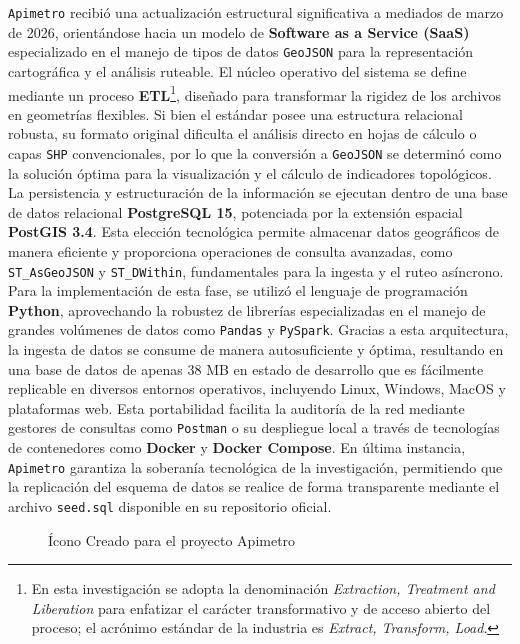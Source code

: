 \texttt{Apimetro} recibió una actualización estructural significativa a mediados de marzo de 2026, orientándose hacia un modelo de 
\textbf{Software as a Service (SaaS)} especializado en el manejo de tipos de datos \texttt{GeoJSON} para la representación cartográfica y el análisis ruteable. El núcleo operativo del sistema se define mediante un proceso \textbf{ETL}\footnote{En esta investigación se adopta la 
denominación \textit{Extraction, Treatment and Liberation} para enfatizar el carácter transformativo y de acceso abierto del proceso; el acrónimo estándar de la industria es \DIFaddbegin {}\DIFaddend \textit{Extract, Transform, Load}\DIFaddbegin {}\DIFaddend .},
diseñado para transformar la rigidez de los archivos \gtfs{} en geometrías flexibles. Si bien el estándar \gtfs{} posee una estructura relacional robusta, su formato original dificulta el análisis 
directo en hojas de cálculo o capas \texttt{SHP} convencionales, por lo que la conversión a \texttt{GeoJSON} se determinó como la solución \DIFdelbegin {}\DIFdelend óptima para la visualización y el cálculo de indicadores topológicos. La persistencia y estructuración de la información 
se ejecutan dentro de una base de datos relacional \textbf{PostgreSQL 15}, potenciada por la extensión espacial \textbf{PostGIS 3.4}. Esta elección tecnológica permite almacenar datos geográficos de manera eficiente y proporciona operaciones de consulta avanzadas, 
como \texttt{ST\_AsGeoJSON} y \texttt{ST\_DWithin}, fundamentales para la ingesta y el ruteo asíncrono. Para la implementación de esta fase, se utilizó el lenguaje de programación \textbf{Python}, aprovechando la robustez de librerías especializadas en el manejo de 
grandes volúmenes de datos como \texttt{Pandas} y \texttt{PySpark}. Gracias a esta arquitectura, la ingesta de datos se consume de manera autosuficiente y óptima, resultando en una base de datos de apenas 38 MB en estado de desarrollo que es fácilmente replicable en 
diversos entornos operativos, incluyendo Linux, Windows, MacOS y plataformas web. Esta portabilidad facilita la auditoría de la red mediante gestores de consultas como \texttt{Postman} o su despliegue local a través de tecnologías de contenedores como \textbf{Docker} y 
\textbf{Docker Compose}. En última instancia, \texttt{Apimetro} garantiza la soberanía tecnológica de la investigación, permitiendo que la replicación del esquema de datos se realice de forma transparente mediante el archivo \texttt{seed.sql} disponible en su repositorio oficial.

\begin{figure}[htbp]
  \centering
  \caption[Ícono Personal de Apimetro]{Ícono Creado para el proyecto Apimetro}
  \label{fig:apimetro-icon}
\end{figure}

